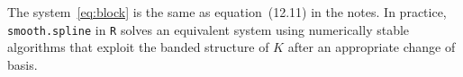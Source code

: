 \begin{remark}
  The system~\eqref{eq:block} is the same as equation~(12.11) in the
  notes.  In practice, \texttt{smooth.spline} in \texttt{R} solves an
  equivalent system using numerically stable algorithms that exploit
  the banded structure of $K$ after an appropriate change of basis.
\end{remark}


